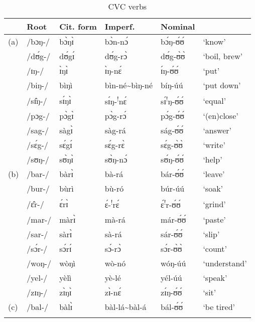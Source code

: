 \documentclass[output=paper,newtxmath,modfonts,nonflat,draftmode]{langsci/langscibook}
\begin{document}
\begin{table}
\begin{tabularx}{\textwidth}{l lXlX X} 
\lsptoprule
& {Root} & {Cit. form} & {Imperf.} & {Nominal} & \\
\midrule
(a)&	/bɔŋ-/&	bɔ̀ŋɪ̀	&bɔ̀n-nɔ́ &	bɔ́ŋ-ʊ́ʊ́&	‘know’\\
&	/dʊ́g-/&	dʊ́gɪ́	&dʊ́g-rɔ̀	&	dʊ́g-ʊ̀ʊ̀	&‘boil, brew’\\
&	/ɪŋ-/&	ɪ̀ŋɪ̀	&ɪ̀ŋ-nɛ́	&ɪ́ŋ-ʊ́ʊ́&	‘put’\\
&	/biŋ-/&	bìŋì	&bìn-né{\textasciitilde}bìŋ-né &	bíŋ-úú	&‘put down’\\
&	/sɪ̂ŋ-/&	sɪ́ŋɪ̀	&sɪ́ŋ-\textsuperscript{!}nɛ́&	sɪ́\textsuperscript{!}ŋ-ʊ́ʊ́&	‘equal’\\
&	/pɔg-/&	pɔ̀gɪ̀	&pɔ̀g-rɔ́&	pɔ́g-ʊ́ʊ́	&‘(en)close’\\
&	/sag-/&	sàgɪ̀	&sàg-rá&	ság-ʊ́ʊ́	&‘answer’\\
&	/sɛ́g-/&	sɛ́gɪ́	&sɛ́g-rɛ̀&	sɛ́g-ʊ̀ʊ̀&	‘write’\\
&	/sʊŋ-/&	sʊ̀ŋɪ̀	&sʊ̀ŋ-nɔ́	&sʊ́ŋ-ʊ́ʊ́	&‘help’\\
\tablevspace
(b)	&/bar-/&	bàrɪ̀	&bà-rá	&bár-ʊ́ʊ́	&‘leave’\\
&	/bur-/&	bùrì	&bù-ró	& búr-úú		&‘soak’\\
&	/ɛ̂r-/	&ɛ́rɪ̀	&ɛ́-\textsuperscript{!}rɛ́	&ɛ́\textsuperscript{!}r-ʊ́ʊ́	&‘grind’\\
&	/mar-/&	màrɪ̀	&mà-rá&	már-ʊ́ʊ́	&‘paste’\\
&	/sar-/	&sàrɪ̀	&sà-rá&	sár-ʊ́ʊ́	&‘slip’\\
&	/sɔ́r-/	&sɔ́rɪ́	&sɔ́-rɔ̀	&sɔ́r-ʊ̀ʊ̀	&‘count’\\
&	/woŋ-/&	wòŋì	&wò-nó	&wóŋ-úú&	‘understand’\\
&	/yel-/&	yèlì	&yè-lé	&yél-úú&	‘speak’\\
&	/zɪŋ-/	&zɪ̀ŋɪ̀	&zɪ̀-nɛ́	&zɪ́ŋ-ʊ́ʊ́	&‘sit’\\
\tablevspace
(c)	&/bal-/&	bàlɪ̀	&bàl-lá{\textasciitilde}bàl-á	&bál-ʊ́ʊ́		&‘be tired’\\
\lspbottomrule
\end{tabularx}
\caption{CVC verbs}
\label{tab:anttila:9}
\end{table}
\end{document}
